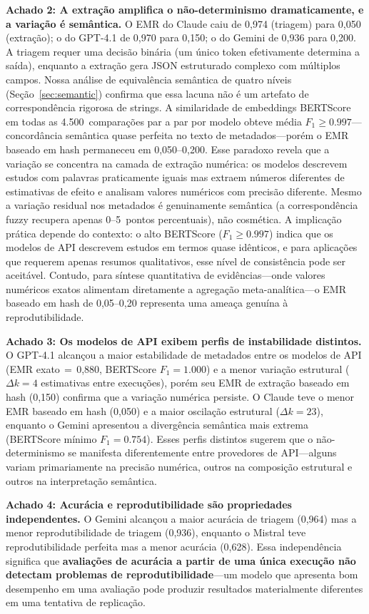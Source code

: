 \documentclass[12pt, a4paper]{article}
\begin{document}
\textbf{Achado 2: A extração amplifica o não-determinismo dramaticamente, e a variação é semântica.}
O EMR do Claude caiu de 0,974 (triagem) para 0,050 (extração); o do GPT-4.1 de 0,970 para 0,150; o do Gemini de 0,936 para 0,200.
A triagem requer uma decisão binária (um único token efetivamente determina a saída), enquanto a extração gera JSON estruturado complexo com múltiplos campos.
Nossa análise de equivalência semântica de quatro níveis (Seção~\ref{sec:semantic}) confirma que essa lacuna não é um artefato de correspondência rigorosa de strings.
A similaridade de embeddings BERTScore em todas as 4.500~comparações par a par por modelo obteve média $F_1{\geq}0.997$---concordância semântica quase perfeita no texto de metadados---porém o EMR baseado em hash permaneceu em 0,050--0,200.
Esse paradoxo revela que a variação se concentra na camada de extração numérica: os modelos descrevem estudos com palavras praticamente iguais mas extraem números diferentes de estimativas de efeito e analisam valores numéricos com precisão diferente.
Mesmo a variação residual nos metadados é genuinamente semântica (a correspondência fuzzy recupera apenas 0--5~pontos percentuais), não cosmética.
A implicação prática depende do contexto: o alto BERTScore ($F_1{\geq}0.997$) indica que os modelos de API descrevem estudos em termos quase idênticos, e para aplicações que requerem apenas resumos qualitativos, esse nível de consistência pode ser aceitável.
Contudo, para síntese quantitativa de evidências---onde valores numéricos exatos alimentam diretamente a agregação meta-analítica---o EMR baseado em hash de 0,05--0,20 representa uma ameaça genuína à reprodutibilidade.

\textbf{Achado 3: Os modelos de API exibem perfis de instabilidade distintos.}
O GPT-4.1 alcançou a maior estabilidade de metadados entre os modelos de API (EMR exato$\,{=}\,$0,880, BERTScore $F_1{=}1.000$) e a menor variação estrutural ($\Delta k{=}4$ estimativas entre execuções), porém seu EMR de extração baseado em hash (0,150) confirma que a variação numérica persiste.
O Claude teve o menor EMR baseado em hash (0,050) e a maior oscilação estrutural ($\Delta k{=}23$), enquanto o Gemini apresentou a divergência semântica mais extrema (BERTScore mínimo $F_1{=}0.754$).
Esses perfis distintos sugerem que o não-determinismo se manifesta diferentemente entre provedores de API---alguns variam primariamente na precisão numérica, outros na composição estrutural e outros na interpretação semântica.

\textbf{Achado 4: Acurácia e reprodutibilidade são propriedades independentes.}
O Gemini alcançou a maior acurácia de triagem (0,964) mas a menor reprodutibilidade de triagem (0,936), enquanto o Mistral teve reprodutibilidade perfeita mas a menor acurácia (0,628).
Essa independência significa que \textbf{avaliações de acurácia a partir de uma única execução não detectam problemas de reprodutibilidade}---um modelo que apresenta bom desempenho em uma avaliação pode produzir resultados materialmente diferentes em uma tentativa de replicação.
\end{document}
